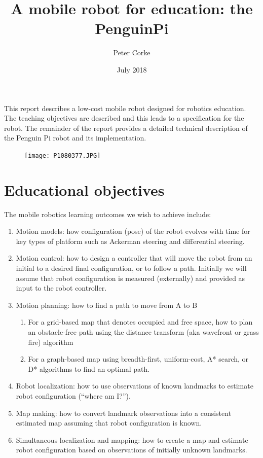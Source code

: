 \documentclass[11pt,fleqn]{article}
\title{A mobile robot for education: the PenguinPi}
\author{Peter Corke}
\date{July 2018} %
\begin{document}
\maketitle
\pagestyle{fancyplain}


This report describes a low-cost mobile robot  designed for robotics education.
The teaching objectives are described and this leads to a specification for the robot.
The remainder of the report provides a detailed technical description of the Penguin Pi  robot and its implementation.

\begin{figure}[h]
\centering
\texttt{[image: P1080377.JPG]}
\end{figure}

\newpage
\tableofcontents
\newpage

\section{Educational objectives}

The mobile robotics learning outcomes we wish to achieve include:
\begin{enumerate}
\item Motion models: how configuration (pose) of the robot evolves with time for key types of platform such as Ackerman steering and differential steering.
\item Motion control: how to design a controller that will move the robot from an initial to a desired final configuration, or to follow a path.  
Initially we will assume that robot configuration is measured (externally) and provided as input to the robot controller.
\item Motion planning: how to find a path to move from A to B
\begin{enumerate}
  \item For a grid-based map that denotes occupied and free space, how to plan an obstacle-free path using the distance transform (aka wavefront or grass fire) algorithm
  \item For a graph-based map using breadth-first, uniform-cost, A* search, or D* algorithms to find an optimal path.
\end{enumerate}
\item Robot localization: how to use observations of known landmarks to estimate robot configuration (``where am I?'').
\item Map making: how to convert landmark observations into a consistent estimated map  assuming that robot configuration is known.
\item Simultaneous localization and mapping: how to create a map and estimate robot configuration based on observations of initially unknown landmarks.
\end{enumerate}
\end{document}
